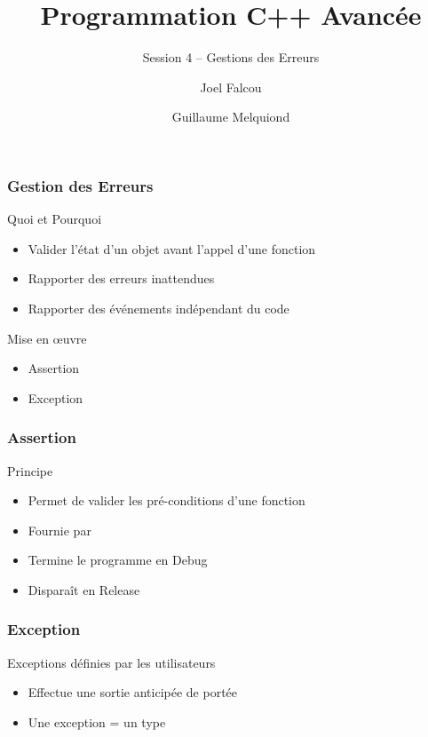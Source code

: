 \documentclass[svgnames]{beamer}
\title{Programmation C++ Avancée}
\subtitle{Session 4 -- Gestions des Erreurs}
\author{Joel Falcou \and Guillaume Melquiond}
\institute{Laboratoire de Recherche en Informatique}
\date{}
\begin{document}


\begin{frame}[plain]
\titlepage
\end{frame}
\setcounter{framenumber}{0}

\frame
{
  \frametitle{Gestion des Erreurs}
  \begin{block}{Quoi et Pourquoi}
  \begin{itemize}
  \item Valider l'état d'un objet avant l'appel d'une fonction
  \item Rapporter des erreurs inattendues
  \item Rapporter des événements indépendant du code
  \end{itemize}
  \end{block}
 
  \begin{block}{Mise en \oe{uvre}}
  \begin{itemize}
  \item Assertion
  \item Exception
  \end{itemize}
  \end{block}
}

\frame
{
  \frametitle{Assertion}
  \begin{block}{Principe}
  \begin{itemize}
  \item Permet de valider les \alert{pré-conditions} d'une fonction
  \item Fournie par 
  \item Termine le programme en Debug
  \item Disparaît en Release
  \end{itemize}
  \end{block}

  \begin{overlayarea}{\textwidth}{4cm}
  \end{overlayarea}
}

\frame
{
  \frametitle{Exception}
  \begin{block}{Exceptions définies par les utilisateurs}
  \begin{itemize}
  \item Effectue une sortie anticipée de portée
  \item Une exception = un type
  \end{itemize}
  \end{block}

  \begin{overlayarea}{\textwidth}{5cm}
  \end{overlayarea}
}
\end{document}
